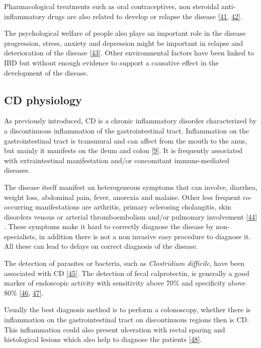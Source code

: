 \documentclass[
  a4paper,
]{book}
\begin{document}
Pharmacological treatments such as oral contraceptives, non steroidal anti-inflammatory drugs are also related to develop or relapse the disease {[}\protect\hyperlink{ref-cornish2008}{41}, \protect\hyperlink{ref-kaufmann1987}{42}{]}.

The psychological welfare of people also plays an important role in the disease progression, stress, anxiety and depression might be important in relapse and deterioration of the disease {[}\protect\hyperlink{ref-bitton2008}{43}{]}.
Other environmental factors have been linked to IBD but without enough evidence to support a causative effect in the development of the disease.

\hypertarget{CD}{%
\subsection{CD physiology}\label{CD}}

As previously introduced, CD is a chronic inflammatory disorder characterized by a discontinuous inflammation of the gastrointestinal tract.
Inflammation on the gastrointestinal tract is transmural and can affect from the mouth to the anus, but mainly it manifests on the ileum and colon {[}\protect\hyperlink{ref-demattos2015}{9}{]}.
It is frequently associated with extraintestinal manifestation and/or concomitant immune-mediated diseases.

The disease itself manifest an heterogeneous symptoms that can involve, diarrhea, weight loss, abdominal pain, fever, anorexia and malaise.
Other less frequent co-occurring manifestations are arthritis, primary sclerosing cholangitis, skin disorders venous or arterial thromboembolism and/or pulmonary involvement {[}\protect\hyperlink{ref-baumgart2012}{44}{]} .
These symptoms make it hard to correctly diagnose the disease by non-specialists, in addition there is not a non invasive easy procedure to diagnose it.
All these can lead to delays on correct diagnosis of the disease.

The detection of parasites or bacteria, such as \emph{Clostridium difficile}, have been associated with CD {[}\protect\hyperlink{ref-khanna2017}{45}{]}.
The detection of fecal calprotectin, is generally a good marker of endoscopic activity with sensitivity above 70\% and specificity above 80\% {[}\protect\hyperlink{ref-guardiola2018}{46}, \protect\hyperlink{ref-sands2015}{47}{]}.

Usually the best diagnosis method is to perform a colonoscopy, whether there is inflammation on the gastrointestinal tract on discontinuous regions then is CD.
This inflammation could also present ulceration with rectal sparing and histological lesions which also help to diagnose the patients {[}\protect\hyperlink{ref-corralizamuxe1rquez2019}{48}{]}.
\end{document}
